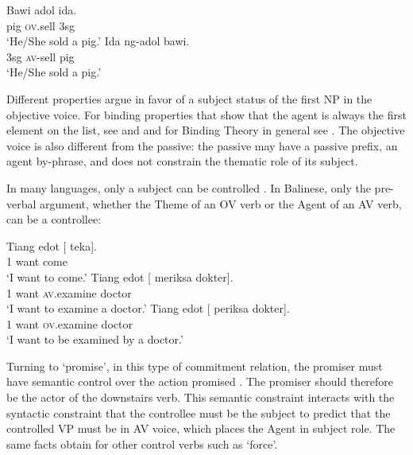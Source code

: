 \documentclass[output=paper
                ,modfonts
                ,nonflat
	        ,collection
	        ,collectionchapter
	        ,collectiontoclongg
 	        ,biblatex
                ,babelshorthands
                ,newtxmath
                ,draftmode
                ,colorlinks, citecolor=brown
]{./langsci/langscibook}
\begin{document}
\begin{exe}
\ex \begin{xlist}
\ex \gll Bawi adol ida. \\
pig \textsc{ov}.sell 3sg \\
\glt `He/She sold a pig.' 
\ex  \gll Ida ng-adol bawi.\\
3sg \textsc{av}-sell pig\\
\glt `He/She sold a pig.'
\end{xlist}
\end{exe}

Different properties argue in favor of a subject status of the first NP in the objective voice. For
binding properties that show that the agent is always the first element on the \argst list, see
 and  and for Binding Theory in general see . The objective voice is also different from the passive: the passive may have a passive prefix, an agent by-phrase, and does not constrain the thematic role of its subject.

In many languages, only a subject
can be controlled \citep{Zaenenetal1985}. In Balinese, only the pre-verbal argument, whether the Theme of an OV verb or the Agent of an AV verb, can be a controllee:

\begin{exe}
\ex \begin{xlist}
\ex 
\gll Tiang edot [ \trace{} teka].\\
     1 want     {} {} come\\\hfill\citep[ex 25]{WechslerandArka1998}
\glt `I want to come.'
\ex 
\gll Tiang edot [ \trace{}  meriksa dokter].\\
     1     want {} {}     \textsc{av}.examine doctor\\
\glt `I want to examine a doctor.'
\ex 
\gll Tiang edot [ \trace{} periksa dokter].\\
     1     want {} {}    \textsc{ov}.examine doctor\\
\glt `I want to be examined by a doctor.'
\end{xlist}
\end{exe}

Turning to  `promise', in this type of commitment relation, the promiser must have semantic control over the action promised \citep{Farkas1988,Kroeger1993,SagandPollard1991}. The promiser should therefore be the actor of the downstairs verb. This semantic constraint interacts with the syntactic constraint that the controllee must be the subject to predict that the controlled VP must be in AV voice, which places the Agent in subject role. The same facts obtain for other control verbs such as  `force'.
\end{document}
